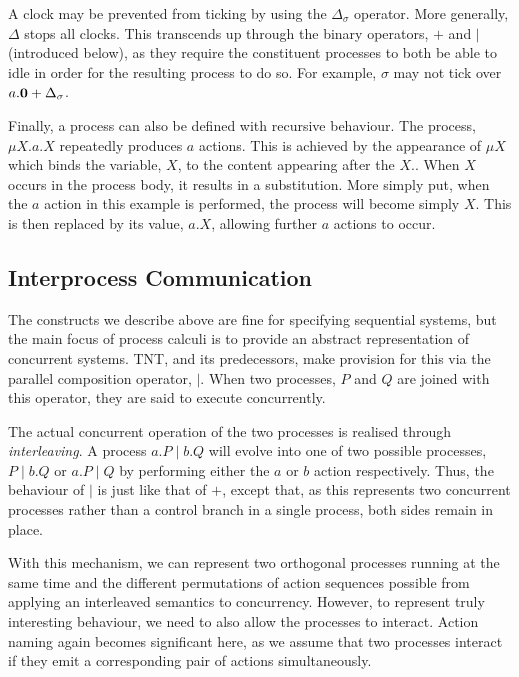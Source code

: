 \documentclass{acm_proc_article-sp}
\begin{document}
A clock may be prevented from ticking by using the $\Delta_\sigma$
operator.  More generally, $\Delta$ stops all clocks.  This transcends
up through the binary operators, $+$ and $\mid$ (introduced below), as
they require the constituent processes to both be able to idle in order
for the resulting process to do so.  For example, $\sigma$ may not tick
over $a.\textbf{0} + \Delta_\sigma$.

Finally, a process can also be defined with recursive behaviour.  The
process, $\mu X.a.X$ repeatedly produces $a$ actions.  This is achieved
by the appearance of $\mu X$ which binds the variable, $X$, to the
content appearing after the $X.$.  When $X$ occurs in the process body,
it results in a substitution.  More simply put, when the $a$ action in this
example is performed, the process will become simply $X$.  This is then
replaced by its value, $a.X$, allowing further $a$ actions to occur.

\subsection{Interprocess Communication}
\label{ipc}

The constructs we describe above are fine for specifying sequential
systems, but the main focus of process calculi is to provide an abstract
representation of concurrent systems.  TNT, and its predecessors, make
provision for this via the parallel composition operator, $\mid$.  When
two processes, $P$ and $Q$ are joined with this operator, they are said
to execute concurrently.  

The actual concurrent operation of the two processes is realised through
\emph{interleaving}.  A process $a.P \mid b.Q$ will evolve into one of
two possible processes, $P \mid b.Q$ or $a.P \mid Q$ by performing
either the $a$ or $b$ action respectively.  Thus, the behaviour of
$\mid$ is just like that of $+$, except that, as this represents two
concurrent processes rather than a control branch in a single process,
both sides remain in place.

With this mechanism, we can represent two orthogonal processes running
at the same time and the different permutations of action sequences
possible from applying an interleaved semantics to concurrency.
However, to represent truly interesting behaviour, we need to also
allow the processes to interact.  Action naming again becomes
significant here, as we assume that two processes interact if they emit
a corresponding pair of actions simultaneously.
\end{document}
